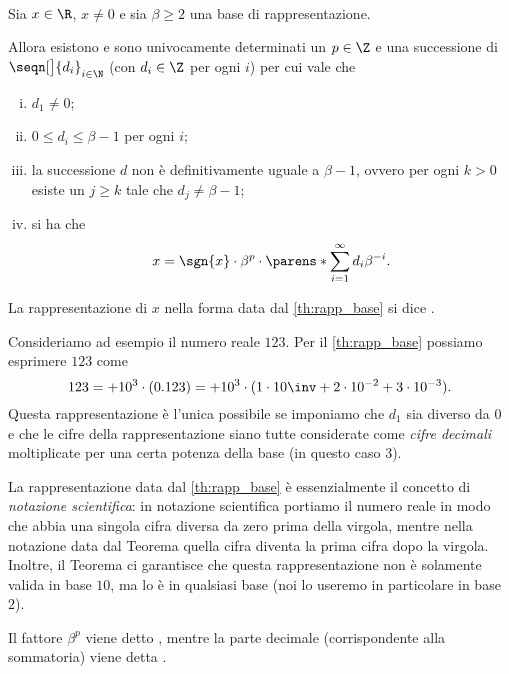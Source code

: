 \begin{theorem}
    \label{th:rapp_base}\ \\
    Sia $x \in \R$, $x \neq 0$ e sia $\beta \geq 2$ una base di rappresentazione. 
    
    Allora esistono e sono univocamente determinati un  $p \in \Z$ e una successione di  $\seqn[\big]{d_i}_{i \in \N}$ (con $d_i \in \Z$ per ogni $i$) per cui vale che
    \begin{enumerate}[(i)]
        \item $d_1 \neq 0$;
        \item $0 \leq d_i \leq \beta - 1$ per ogni $i$;
        \item la successione $d$ non è definitivamente uguale a $\beta - 1$, ovvero per ogni $k > 0$ esiste un $j \geq k$ tale che $d_j \neq \beta - 1$;
        \item si ha che \[
            x = \sgn{x} \cdot \beta^p \cdot \parens*{\sum_{i=1}^\infty d_i\beta^{-i}}.
        \] 
    \end{enumerate}
\end{theorem}

La rappresentazione di $x$ nella forma data dal \autoref{th:rapp_base} si dice .

\begin{example}
    Consideriamo ad esempio il numero reale $123$. Per il \autoref{th:rapp_base} possiamo esprimere $123$ come \[
        123 = +10^3 \cdot (0.123) = + 10^3 \cdot (1 \cdot 10\inv + 2 \cdot 10^{-2} + 3 \cdot 10^{-3}).
    \] Questa rappresentazione è l'unica possibile se imponiamo che $d_1$ sia diverso da $0$ e che le cifre della rappresentazione siano tutte considerate come \emph{cifre decimali} moltiplicate per una certa potenza della base (in questo caso $3$).
\end{example}

La rappresentazione data dal \autoref{th:rapp_base} è essenzialmente il concetto di \emph{notazione scientifica}: in notazione scientifica portiamo il numero reale in modo che abbia una singola cifra diversa da zero prima della virgola, mentre nella notazione data dal Teorema quella cifra diventa la prima cifra dopo la virgola. 
Inoltre, il Teorema ci garantisce che questa rappresentazione non è solamente valida in base $10$, ma lo è in qualsiasi base (noi lo useremo in particolare in base $2$).

Il fattore $\beta^p$ viene detto , mentre la parte decimale (corrispondente alla sommatoria) viene detta . 


